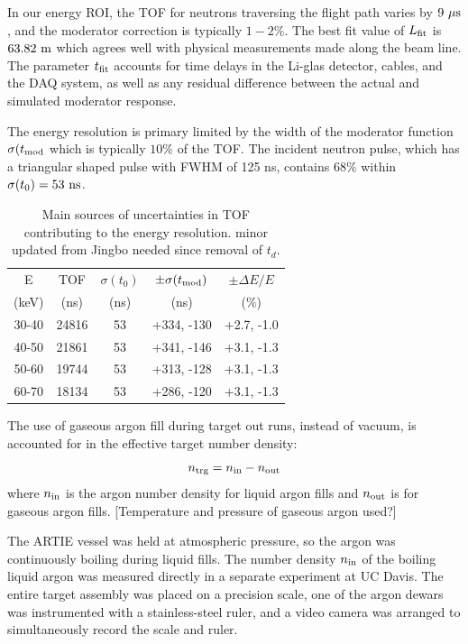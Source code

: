 \documentclass[%
 reprint,
superscriptaddress,
 preprintnumbers,
 nofootinbib,
 nobibnotes,
 bibnotes,
 amsmath,amssymb,
 aps,
 prl, 
 floatfix,
]{revtex4-1}
\begin{document}
In our energy ROI, the TOF for neutrons traversing the flight path
varies by $9~{\rm \mu s}$, and the moderator correction is typically
$1-2\%$.  The best fit value of $L_{\rm fit}$ is $63.82~\rm m$ which
agrees well with physical measurements made along the beam line.  The
parameter $t_{\rm fit}$ accounts for time delays in the Li-glas
detector, cables, and the DAQ system, as well as any residual
difference between the actual and simulated moderator response.

The energy resolution is primary limited by the width of the moderator
function $\sigma(t_{\rm mod}$ which is typically $10\%$ of the TOF.
The incident neutron pulse, which has a triangular shaped pulse with
FWHM of 125 ns, contains $68\%$ within $\sigma(t_0) = 53~\rm ns$.

\begin{table}[h!]
    \centering
    \begin{tabular}{|c|c|c|c|c|}
    \hline
    E & TOF &  $\sigma(t_{0})$ & $\pm \sigma(t_{\rm mod})$  & $\pm \Delta E/E$ \\
    (keV) & (ns) & (ns) & (ns) & ($\%$) \\\hline 
    30-40 & 24816 & 53 & +334, -130 & +2.7, -1.0\\
    40-50 & 21861 & 53 & +341, -146 & +3.1, -1.3\\
    50-60 & 19744 & 53 & +313, -128  & +3.1, -1.3\\
    60-70 & 18134 & 53 & +286, -120  & +3.1, -1.3\\\hline
    \end{tabular}
    \caption{Main sources of uncertainties in TOF contributing to the energy resolution. {\color{red} minor updated from Jingbo needed since removal of $t_d$.}}
    \label{tab:tof_error}
\end{table}

The use of gaseous argon fill during target out runs, instead of
vacuum, is accounted for in the effective target number density:
\begin{equation}
  n_{\rm trg} = n_{\rm in} - n_{\rm out}
\label{eq:rho(E)}
\end{equation}
where $n_{\rm in}$ is the argon number density for liquid argon fills
and $n_{\rm out}$ is for gaseous argon fills.  {\color{red} [Temperature and pressure of gaseous argon used?]}

The ARTIE vessel was held at atmospheric pressure, so the argon was
continuously boiling during liquid fills.  The number density $n_{\rm
  in}$ of the boiling liquid argon was measured directly in a separate
experiment at UC Davis.  The entire target assembly was placed on a
precision scale, one of the argon dewars was instrumented with a
stainless-steel ruler, and a video camera was arranged to
simultaneously record the scale and ruler.
\end{document}
